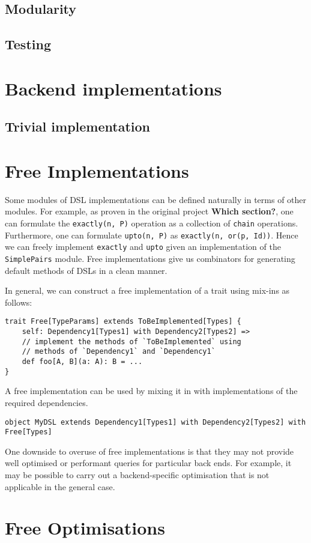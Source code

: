 \documentclass{report}
\newcommand \2[0]{\textbf{2}}
\newcommand \3[0]{\textbf{3}}
\newcommand{\todo}[1]{\textbf{#1}}
\begin{document}
\section{Modularity}
\section{Testing}

\chapter{Backend implementations}
\section{Trivial implementation}


\chapter{Free Implementations}
Some modules of DSL implementations can be defined naturally in terms of other modules. For example, as proven in the original project \todo{Which section?}, one can formulate the \texttt{exactly(n, P)} operation as a collection of \texttt{chain} operations. Furthermore, one can formulate \texttt{upto(n, P)} as \texttt{exactly(n, or(p, Id))}. Hence we can freely implement \texttt{exactly} and \texttt{upto} given an implementation of the \texttt{SimplePairs} module. Free implementations give us combinators for generating default methods of DSLs in a clean manner.

In general, we can construct a free implementation of a trait using mix-ins as follows:

\begin{verbatim}
trait Free[TypeParams] extends ToBeImplemented[Types] {
    self: Dependency1[Types1] with Dependency2[Types2] =>
    // implement the methods of `ToBeImplemented` using 
    // methods of `Dependency1` and `Dependency1`
    def foo[A, B](a: A): B = ...
}
\end{verbatim}

A free implementation can be used by mixing it in with implementations of the required dependencies.

\begin{verbatim}
object MyDSL extends Dependency1[Types1] with Dependency2[Types2] with Free[Types]
\end{verbatim}

One downside to overuse of free implementations is that they may not provide well optimised or performant queries for particular back ends. For example, it may be possible to carry out a backend-specific optimisation that is not applicable in the general case.
\chapter{Free Optimisations}

    
\end{document}
